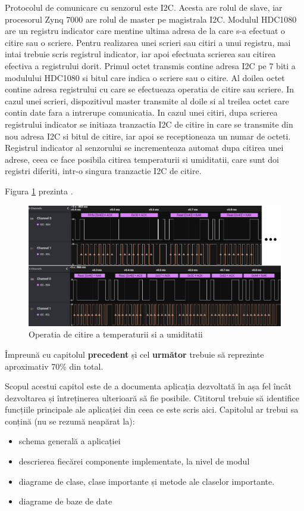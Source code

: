 Protocolul de comunicare cu senzorul este I2C. Acesta are rolul de slave, iar procesorul Zynq 7000 are rolul de master pe magistrala I2C. Modulul HDC1080 are un 
registru indicator care mentine ultima adresa de la care s-a efectuat o citire sau o scriere. Pentru realizarea unei scrieri sau citiri a unui registru, mai intai 
trebuie scris registrul indicator, iar apoi efectuata scrierea sau citirea efectiva a registrului dorit. Primul octet transmis contine adresa I2C pe 7 biti a 
modulului HDC1080 si bitul care indica o scriere sau o citire. Al doilea octet contine adresa registrului cu care se efectueaza operatia de citire sau scriere. 
In cazul unei scrieri, dispozitivul master transmite al doile si al treilea octet care contin date fara a intrerupe comunicatia. In cazul unei citiri, dupa scrierea 
registrului indicator se initiaza tranzactia I2C de citire in care se transmite din nou adresa I2C si bitul de citire, iar apoi se receptioneaza un numar de octeti. 
Registrul indicator al senzorului se incrementeaza automat dupa citirea unei adrese, ceea ce face posibila citirea temperaturii si umiditatii, care sunt doi registri 
diferiti, intr-o singura tranzactie I2C de citire.

Figura \ref{fig:PI_HDC1080ReadOperation} prezinta .
\begin{figure}[H]
    \centering
    \includegraphics[scale=0.55]{figs/PI_HDC1080ReadOperation.png}
    \caption{Operatia de citire a temperaturii si a umiditatii}
    \label{fig:PI_HDC1080ReadOperation}
\end{figure}


{\color{blue}Împreună cu capitolul \textbf{precedent} și cel \textbf{următor} trebuie să reprezinte aproximativ 70\% din total.\\}

Scopul acestui capitol este de a documenta aplicația dezvoltată în așa fel încât dezvoltarea și întreținerea ulterioară să fie posibile.
Cititorul trebuie să identifice funcțiile principale ale aplicației din ceea ce este scris aici.
Capitolul ar trebui sa conțină (nu se rezumă neapărat la):
\begin{itemize}
	\item schema generală a aplicației
	\item descrierea fiecărei componente implementate, la nivel de modul
	\item diagrame de clase, clase importante și metode ale claselor importante.
    \item diagrame de baze de date
\end{itemize}
